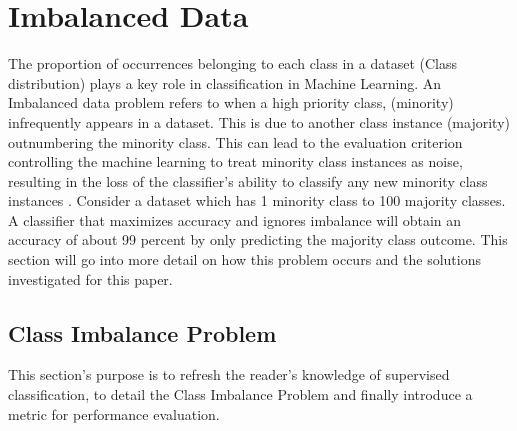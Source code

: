 \section{Imbalanced Data}
The proportion of occurrences belonging to each class in a dataset (Class distribution) plays a key role in classification in Machine Learning. An Imbalanced data problem refers to when a high priority class, (minority) infrequently appears in a dataset. This is due to another class instance (majority) outnumbering the minority class. This can lead to the evaluation criterion controlling the machine learning to treat minority class instances as noise, resulting in the loss of the classifier’s ability to classify any new minority class instances \cite{Imbalsourcegood}. Consider a dataset which has 1 minority class to 100 majority classes. A classifier that maximizes accuracy and ignores imbalance will obtain an accuracy of about 99 percent by only predicting the majority class outcome. This section will go into more detail on how this problem occurs and the solutions investigated for this paper.

\subsection{Class Imbalance Problem} 
This section’s purpose is to refresh the reader's knowledge of supervised classification, to detail the Class Imbalance Problem and finally introduce a metric for performance evaluation.


